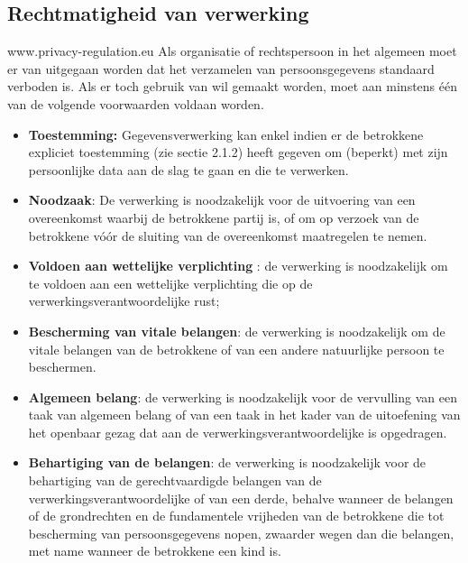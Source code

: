 \subsection{Rechtmatigheid van verwerking} www.privacy-regulation.eu
Als organisatie of rechtspersoon in het algemeen moet er van uitgegaan worden dat het verzamelen van persoonsgegevens standaard verboden is. Als er toch gebruik van wil gemaakt worden, moet aan minstens één van de volgende voorwaarden voldaan worden. 
\begin{itemize}
    \item \textbf{Toestemming:} Gegevensverwerking kan enkel indien er de betrokkene expliciet toestemming (zie sectie 2.1.2) heeft gegeven om (beperkt) met zijn persoonlijke data aan de slag te gaan en die te verwerken. \\
    
    \item \textbf{Noodzaak}: De verwerking is noodzakelijk voor de uitvoering van een overeenkomst waarbij de betrokkene partij is, of om op verzoek van de betrokkene vóór de sluiting van de overeenkomst maatregelen te nemen. \\
    
    \item \textbf{Voldoen aan wettelijke verplichting }: de verwerking is noodzakelijk om te voldoen aan een wettelijke verplichting die op de verwerkingsverantwoordelijke rust; \\
    
     \item \textbf{Bescherming van vitale belangen}:  de verwerking is noodzakelijk om de vitale belangen van de betrokkene of van een andere natuurlijke persoon te beschermen. \\
    
    \item \textbf{Algemeen belang}: de verwerking is noodzakelijk voor de vervulling van een taak van algemeen belang of van een taak in het kader van de uitoefening van het openbaar gezag dat aan de verwerkingsverantwoordelijke is opgedragen. \\
    
     \item \textbf{Behartiging van de belangen}: de verwerking is noodzakelijk voor de behartiging van de gerechtvaardigde belangen van de verwerkingsverantwoordelijke of van een derde, behalve wanneer de belangen of de grondrechten en de fundamentele vrijheden van de betrokkene die tot bescherming van persoonsgegevens nopen, zwaarder wegen dan die belangen, met name wanneer de betrokkene een kind is. \\
\end{itemize}



